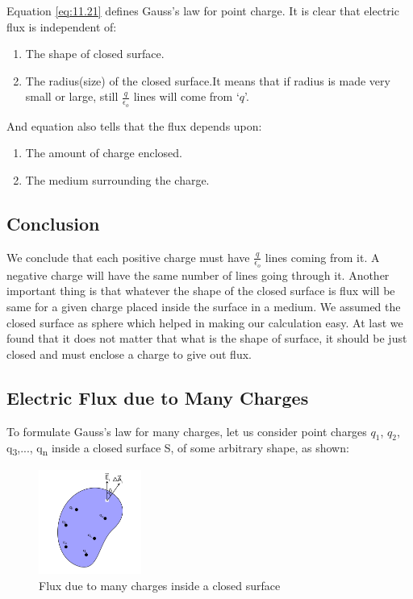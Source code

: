 \noindent Equation \ref{eq:11.21} defines Gauss’s law for point charge. It is clear that electric flux is independent of:
\begin{enumerate}[label=(\roman*)] 
\item The shape of closed surface.
\item The radius(size) of the closed surface.It means that if radius
is made very small or large, still $\frac{q}{\epsilon_{o}}$ lines will come from `$q$'.
\end{enumerate}
And equation also tells that the flux depends upon:
\begin{enumerate}[label=(\roman*)]
\item The amount of charge enclosed.
\item The medium surrounding the charge.
\end{enumerate}
\subsection*{Conclusion}
We conclude that each positive charge must have $\frac{q}{\epsilon_{o}}$ lines coming from it.
A negative charge will have the same number of lines going through it.
Another important thing is that whatever the shape of the closed surface
is flux will be same for a given charge placed inside the surface in a
medium. We assumed the closed surface as sphere which helped in making
our calculation easy. At last we found that it does not matter that
what is the shape of surface, it should be just closed and must enclose
a charge to give out flux.
\subsection{Electric Flux due to Many Charges}
To formulate Gauss’s law for many charges,
let us consider point charges $q_{1}$, $q_{2}$,
q\textsubscript{3},..., q\textsubscript{n}
inside a closed surface S, of some arbitrary shape, as shown:

\begin{figure}[H]
  \centering
  \captionsetup{justification = centering}
  \includegraphics[width=0.3\textwidth]{Images/Chapter-11/11.15.png}
  \caption{Flux due to many charges inside a closed surface}
  \label{fig:11.15}
\end{figure}

